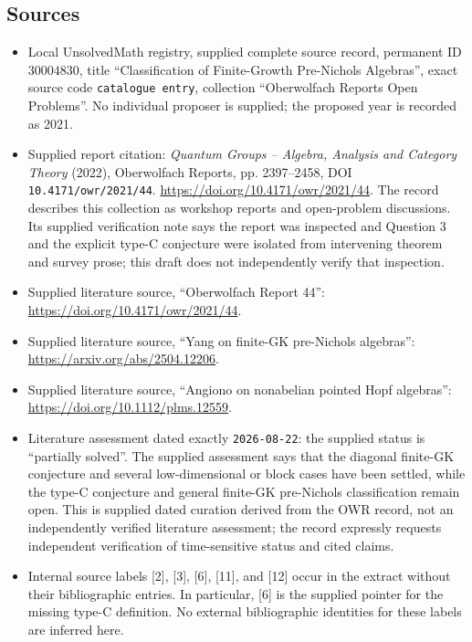\documentclass[11pt]{article}
\begin{document}
\subsection{Sources}
\begin{itemize}
\item Local UnsolvedMath registry, supplied complete source record, permanent ID \(30004830\), title ``Classification of Finite-Growth Pre-Nichols Algebras'', exact source code \texttt{catalogue entry}, collection ``Oberwolfach Reports Open Problems''. No individual proposer is supplied; the proposed year is recorded as 2021.
\item Supplied report citation: \emph{Quantum Groups -- Algebra, Analysis and Category Theory} (2022), Oberwolfach Reports, pp. 2397--2458, DOI \texttt{10.4171/owr/2021/44}. \url{https://doi.org/10.4171/owr/2021/44}. The record describes this collection as workshop reports and open-problem discussions. Its supplied verification note says the report was inspected and Question 3 and the explicit type-C conjecture were isolated from intervening theorem and survey prose; this draft does not independently verify that inspection.
\item Supplied literature source, ``Oberwolfach Report 44'': \url{https://doi.org/10.4171/owr/2021/44}.
\item Supplied literature source, ``Yang on finite-GK pre-Nichols algebras'': \url{https://arxiv.org/abs/2504.12206}.
\item Supplied literature source, ``Angiono on nonabelian pointed Hopf algebras'': \url{https://doi.org/10.1112/plms.12559}.
\item Literature assessment dated exactly \texttt{2026-08-22}: the supplied status is ``partially solved''. The supplied assessment says that the diagonal finite-GK conjecture and several low-dimensional or block cases have been settled, while the type-C conjecture and general finite-GK pre-Nichols classification remain open. This is supplied dated curation derived from the OWR record, not an independently verified literature assessment; the record expressly requests independent verification of time-sensitive status and cited claims.
\item Internal source labels [2], [3], [6], [11], and [12] occur in the extract without their bibliographic entries. In particular, [6] is the supplied pointer for the missing type-C definition. No external bibliographic identities for these labels are inferred here.
\end{itemize}
\end{document}
